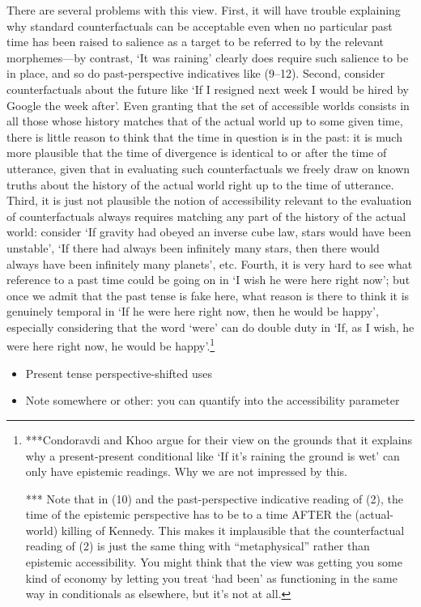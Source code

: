 There are several problems with this view. First, it will have trouble
explaining why standard counterfactuals can be acceptable even when no
particular past time has been raised to salience as a target to be
referred to by the relevant morphemes---by contrast, `It was raining'
clearly does require such salience to be in place, and so do
past-perspective indicatives like (9--12). Second, consider
counterfactuals about the future like `If I resigned next week I would
be hired by Google the week after'. Even granting that the set of
accessible worlds consists in all those whose history matches that of
the actual world up to some given time, there is little reason to think
that the time in question is in the past: it is much more plausible that
the time of divergence is identical to or after the time of utterance,
given that in evaluating such counterfactuals we freely draw on known
truths about the history of the actual world right up to the time of
utterance. Third, it is just not plausible the notion of accessibility
relevant to the evaluation of counterfactuals always requires matching
any part of the history of the actual world: consider `If gravity had
obeyed an inverse cube law, stars would have been unstable', `If there
had always been infinitely many stars, then there would always have been
infinitely many planets', etc. Fourth, it is very hard to see what
reference to a past time could be going on in `I wish he were here right
now'; but once we admit that the past tense is fake here, what reason is
there to think it is genuinely temporal in `If he were here right now,
then he would be happy', especially considering that the word `were' can
do double duty in `If, as I wish, he were here right now, he would be
happy'.\footnote{***Condoravdi and Khoo argue for their view on the
  grounds that it explains why a present-present conditional like `If
  it's raining the ground is wet' can only have epistemic readings. Why
  we are not impressed by this.

  *** Note that in (10) and the past-perspective indicative reading of
  (2), the time of the epistemic perspective has to be to a time AFTER
  the (actual-world) killing of Kennedy. This makes it implausible that
  the counterfactual reading of (2) is just the same thing with
  ``metaphysical'' rather than epistemic accessibility. You might think
  that the view was getting you some kind of economy by letting you
  treat `had been' as functioning in the same way in conditionals as
  elsewhere, but it's not at all.}

\begin{itemize}
\item
  Present tense perspective-shifted uses
\item
  Note somewhere or other: you can quantify into the accessibility
  parameter
\end{itemize}

